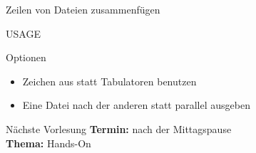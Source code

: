 \documentclass[aspectratio=43]{beamer}
\begin{document}
\begin{frame} 
	\begin{block}{} 
        Zeilen von Dateien zusammenfügen
	\end{block}
	\begin{block}{USAGE} 
	\end{block}
	\begin{exampleblock}{Optionen} 
	\begin{itemize}
	\item {} \newline Zeichen aus  statt Tabulatoren benutzen
	\item {} \newline Eine Datei nach der anderen statt parallel ausgeben
	\end{itemize}
	\end{exampleblock}
\end{frame}


\begin{frame}[plain]
\begin{alertblock}{Nächste Vorlesung}
\textbf{Termin:} nach der Mittagspause\\
\textbf{Thema:} Hands-On\\
\end{alertblock}
\end{frame}

\materialframe
\end{document}
